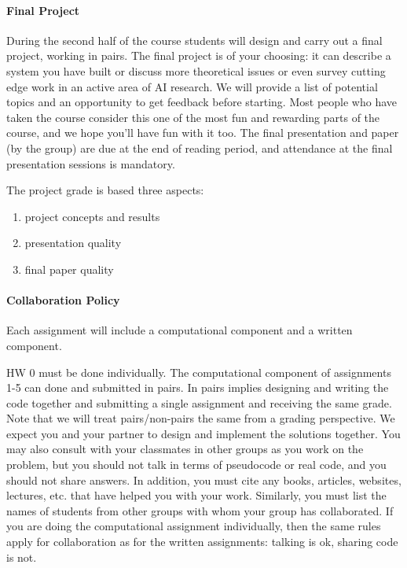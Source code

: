 \documentclass[11pt]{article}
\begin{document}
\paragraph{Final Project}

During the second half of the course students will design and carry
out a final project, working in pairs. The final project is of your
choosing: it can describe a system you have built or discuss more
theoretical issues or even survey cutting edge work in an active area
of AI research. We will provide a list of potential topics and an
opportunity to get feedback before starting. Most people who have
taken the course consider this one of the most fun and rewarding parts
of the course, and we hope you'll have fun with it too. The final
presentation and paper (by the group) are due at the end of reading
period, and attendance at the final presentation sessions is
mandatory.

The project grade is based three aspects: 
\begin{enumerate}
\item project concepts and results 
\item presentation quality 
\item final paper quality 
\end{enumerate}

\paragraph{Collaboration Policy}

Each assignment will include a computational component and a written component.

HW 0 must be done individually. The computational component of assignments 1-5 can done and submitted in pairs. In pairs implies designing and writing the code together and submitting a single assignment and receiving the same grade. Note that we will treat pairs/non-pairs the same from a grading perspective.  We expect you and your partner to design and implement the solutions together. You may also consult with your classmates in other groups as you work on the problem, but you should not talk in terms of pseudocode or real code, and you should not share answers. In addition, you must cite any books, articles, websites, lectures, etc. that have helped you with your work. Similarly, you must list the names of students from other groups with whom your group has collaborated. If you are doing the computational assignment individually, then the same rules apply for collaboration as for the written assignments: talking is ok, sharing code is not.
\end{document}
